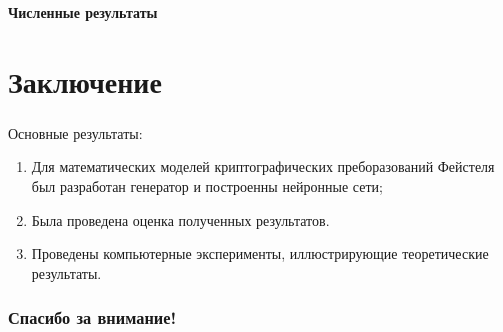 \documentclass[notheorems]{beamer}
\theoremstyle{plain}
\theoremstyle{definition}
\theoremstyle{remark}
\begin{document}
\begin{frame}
	\frametitle{\secname}
	\framesubtitle{Численные результаты}
	
	
\end{frame}

\section{Заключение}
\begin{frame}
  \frametitle{\secname}
  Основные результаты:
  \begin{enumerate}
    \item Для математических моделей криптографических преборазований Фейстеля был разработан генератор и построенны нейронные сети;
    \item Была проведена оценка полученных результатов.
    \item Проведены компьютерные эксперименты, иллюстрирующие теоретические результаты.
  \end{enumerate}
\end{frame}

\begin{frame}[c]
\begin{center}
\frametitle{\LARGE Спасибо за внимание!}

\bigskip

\inserttitle

\bigskip\bigskip
\insertauthor

\bigskip\bigskip\bigskip\bigskip\bigskip\bigskip

\insertdate

\end{center}
\end{frame}
\end{document}
